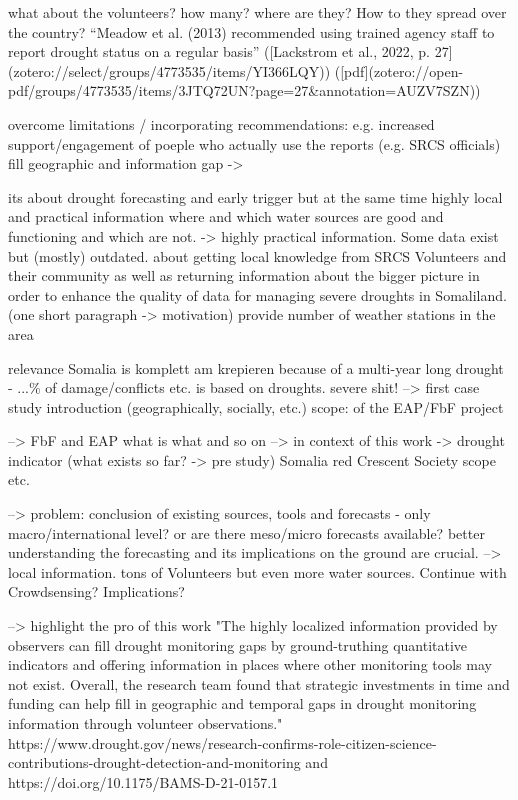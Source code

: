what about the volunteers? how many? where are they? How to they spread over the country?
“Meadow et al. (2013) recommended using trained agency staff to report drought status on a regular basis” ([Lackstrom et al., 2022, p. 27](zotero://select/groups/4773535/items/YI366LQY)) ([pdf](zotero://open-pdf/groups/4773535/items/3JTQ72UN?page=27\&annotation=AUZV7SZN))

overcome limitations / incorporating recommendations: e.g. increased support/engagement of poeple who actually use the reports (e.g. SRCS officials) 
fill geographic and information gap ->

its about drought forecasting and early trigger but at the same time highly local and practical information where and which water sources are good and functioning and which are not. -> highly practical information. Some data exist but (mostly) outdated.
about getting local knowledge from SRCS Volunteers and their community as well as returning information about the bigger picture
in order to enhance the quality of data for managing severe droughts in Somaliland. (one short paragraph -> motivation)
provide number of weather stations in the area

relevance
Somalia is komplett am krepieren because of a multi-year long drought - ...\% of damage/conflicts etc. is based on droughts. severe shit! --> first case study introduction (geographically, socially, etc.) 
scope: of the EAP/FbF project

--> FbF and EAP what is what and so on --> in context of this work -> drought indicator (what exists so far? -> pre study)
Somalia red Crescent Society scope etc. 

--> problem: conclusion of existing sources, tools and forecasts - only macro/international level? or are there meso/micro forecasts available?
better understanding the forecasting and its implications on the ground are crucial. --> local information. tons of Volunteers but even more water sources. Continue with Crowdsensing? Implications?

--> highlight the pro of this work
"The highly localized information provided by observers can fill drought monitoring gaps by ground-truthing quantitative indicators and offering information in places where other monitoring tools may not exist. Overall, the research team found that strategic investments in time and funding can help fill in geographic and temporal gaps in drought monitoring information through volunteer observations."
https://www.drought.gov/news/research-confirms-role-citizen-science-contributions-drought-detection-and-monitoring and https://doi.org/10.1175/BAMS-D-21-0157.1


